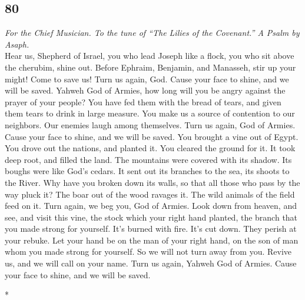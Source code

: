 \begin{paracol}{2}
\switchcolumn
\begin{otherlanguage}{english}

\hypertarget{section-159}{%
\section{80}\label{section-159}}

\emph{For the Chief Musician. To the tune of ``The Lilies of the
Covenant.'' A Psalm by Asaph.}\\
 Hear us, Shepherd of Israel, you who lead Joseph like a
flock, you who sit above the cherubim, shine out.  Before
Ephraim, Benjamin, and Manasseh, stir up your might! Come to save us!
 Turn us again, God. Cause your face to shine, and we will
be saved.  Yahweh God of Armies, how long will you be
angry against the prayer of your people?  You have fed
them with the bread of tears, and given them tears to drink in large
measure.  You make us a source of contention to our
neighbors. Our enemies laugh among themselves.  Turn us
again, God of Armies. Cause your face to shine, and we will be saved.
 You brought a vine out of Egypt. You drove out the
nations, and planted it.  You cleared the ground for it.
It took deep root, and filled the land.  The mountains
were covered with its shadow. Its boughs were like God's cedars.
 It sent out its branches to the sea, its shoots to the
River.  Why have you broken down its walls, so that all
those who pass by the way pluck it?  The boar out of the
wood ravages it. The wild animals of the field feed on it.
 Turn again, we beg you, God of Armies. Look down from
heaven, and see, and visit this vine,  the stock which
your right hand planted, the branch that you made strong for yourself.
 It's burned with fire. It's cut down. They perish at
your rebuke.  Let your hand be on the man of your right
hand, on the son of man whom you made strong for yourself.
 So we will not turn away from you. Revive us, and we
will call on your name.  Turn us again, Yahweh God of
Armies. Cause your face to shine, and we will be saved.

\end{otherlanguage}

\switchcolumn[0]*

\hypertarget{canciuxf3n-del-festival.-con-penitencia}{%
}
\end{paracol}
